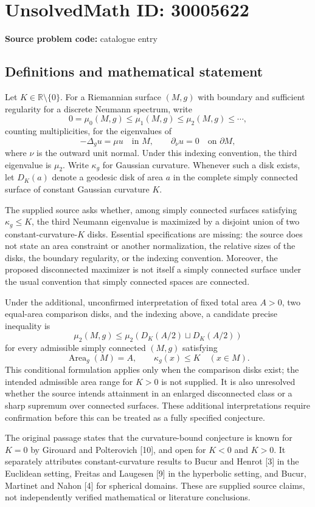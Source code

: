 \documentclass[11pt]{article}
\newcommand{\R}{\mathbb{R}}
\begin{document}
\section*{UnsolvedMath ID: 30005622}
\textbf{Source problem code:} catalogue entry
\subsection{Definitions and mathematical statement}
Let \(K\in\R\setminus\{0\}\). For a Riemannian surface \((M,g)\) with boundary and sufficient regularity for a discrete Neumann spectrum, write
\[
0=\mu_0(M,g)\leq\mu_1(M,g)\leq\mu_2(M,g)\leq\cdots,
\]
counting multiplicities, for the eigenvalues of
\[
-\Delta_g u=\mu u\quad\text{in }M,\qquad
\partial_\nu u=0\quad\text{on }\partial M,
\]
where \(\nu\) is the outward unit normal. Under this indexing convention, the third eigenvalue is \(\mu_2\). Write \(\kappa_g\) for Gaussian curvature. Whenever such a disk exists, let \(D_K(a)\) denote a geodesic disk of area \(a\) in the complete simply connected surface of constant Gaussian curvature \(K\).

The supplied source asks whether, among simply connected surfaces satisfying \(\kappa_g\leq K\), the third Neumann eigenvalue is maximized by a disjoint union of two constant-curvature-\(K\) disks. Essential specifications are missing: the source does not state an area constraint or another normalization, the relative sizes of the disks, the boundary regularity, or the indexing convention. Moreover, the proposed disconnected maximizer is not itself a simply connected surface under the usual convention that simply connected spaces are connected.

Under the additional, unconfirmed interpretation of fixed total area \(A>0\), two equal-area comparison disks, and the indexing above, a candidate precise inequality is
\[
\mu_2(M,g)\leq
\mu_2\!\left(D_K(A/2)\sqcup D_K(A/2)\right)
\]
for every admissible simply connected \((M,g)\) satisfying
\[
\operatorname{Area}_g(M)=A,\qquad \kappa_g(x)\leq K\quad(x\in M).
\]
This conditional formulation applies only when the comparison disks exist; the intended admissible area range for \(K>0\) is not supplied. It is also unresolved whether the source intends attainment in an enlarged disconnected class or a sharp supremum over connected surfaces. These additional interpretations require confirmation before this can be treated as a fully specified conjecture.

The original passage states that the curvature-bound conjecture is known for \(K=0\) by Girouard and Polterovich [10], and open for \(K<0\) and \(K>0\). It separately attributes constant-curvature results to Bucur and Henrot [3] in the Euclidean setting, Freitas and Laugesen [9] in the hyperbolic setting, and Bucur, Martinet and Nahon [4] for spherical domains. These are supplied source claims, not independently verified mathematical or literature conclusions.
\end{document}
